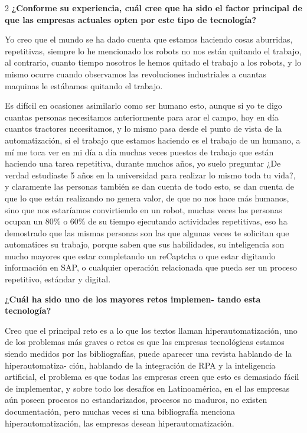 \documentclass[12pt,spanish,Letterpaper,openany]{book}
\begin{document}
\begin {multicols}{2}
\textbf{¿Conforme su experiencia, cuál cree que ha sido el factor principal de que las empresas actuales opten por este tipo de tecnología?}

Yo creo que el mundo se ha dado cuenta que estamos haciendo cosas aburridas, repetitivas, siempre lo he mencionado los robots no nos están quitando el trabajo, al contrario, cuanto tiempo nosotros le hemos quitado el trabajo a los robots, y lo mismo ocurre cuando observamos las revoluciones industriales a cuantas maquinas le estábamos quitando el trabajo.

Es difícil en ocasiones asimilarlo como ser humano esto, aunque si yo te digo cuantas personas necesitamos anteriormente para arar el campo, hoy en día cuantos tractores necesitamos, y lo mismo pasa desde el punto de vista de la automatización, si el trabajo que estamos haciendo es el trabajo de un humano, a mí me toca ver en mi día a día muchas veces puestos de trabajo que están haciendo una tarea repetitiva, durante muchos años, yo suelo preguntar ¿De verdad estudiaste 5 años en la universidad para realizar lo mismo toda tu vida?, y claramente las personas también se dan cuenta de todo esto, se dan cuenta de que lo que están realizando no genera valor, de que no nos hace más humanos, sino que nos estaríamos convirtiendo en un robot, muchas veces las personas ocupan un 80\% o 60\% de su tiempo ejecutando actividades repetitivas, eso ha demostrado que las mismas personas son las que algunas veces te solicitan que automatices su trabajo, porque saben que sus habilidades, su inteligencia son mucho mayores que estar completando un reCaptcha o que estar digitando información en SAP, o cualquier operación relacionada que pueda ser un proceso repetitivo, estándar y digital.

\textbf{¿Cuál ha sido uno de los mayores retos implemen-
tando esta tecnología?}

Creo que el principal reto es a lo que los textos llaman hiperautomatización, uno de los problemas más graves o retos es que las empresas tecnológicas estamos siendo medidos por las bibliografías, puede aparecer una revista hablando de la hiperautomatiza-
ción, hablando de la integración de RPA y la inteligencia artificial, el problema es que todas las empresas creen que esto es demasiado fácil de implementar, y sobre todo los desafíos en Latinoamérica, en el las empresas aún poseen procesos no estandarizados, procesos no maduros, no existen documentación, pero muchas veces si una bibliografía menciona hiperautomatización, las empresas desean hiperautomatización.


\end{multicols}
\end{document}
